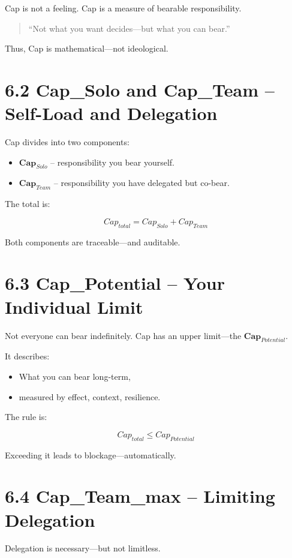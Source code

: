 \documentclass[12pt,a4paper]{book}
\begin{document}
Cap is not a feeling.  
Cap is a measure of bearable responsibility.

\begin{quote}
“Not what you want decides—but what you can bear.”  
\end{quote}

Thus, Cap is mathematical—not ideological.

\section*{6.2 Cap\_Solo and Cap\_Team – Self-Load and Delegation}

Cap divides into two components:

\begin{itemize}
    \item $\textbf{Cap}_{Solo}$ – responsibility you bear yourself.
    \item $\textbf{Cap}_{Team}$ – responsibility you have delegated but co-bear.
\end{itemize}

The total is:

\[
Cap_{total} = Cap_{Solo} + Cap_{Team}
\]

Both components are traceable—and auditable.

\section*{6.3 Cap\_Potential – Your Individual Limit}

Not everyone can bear indefinitely.  
Cap has an upper limit—the $\textbf{Cap}_{Potential}$.

It describes:

\begin{itemize}
    \item What you can bear long-term,
    \item measured by effect, context, resilience.
\end{itemize}

The rule is:

\[
Cap_{total} \leq Cap_{Potential}
\]

Exceeding it leads to blockage—automatically.

\section*{6.4 Cap\_Team\_max – Limiting Delegation}

Delegation is necessary—but not limitless.
\end{document}
